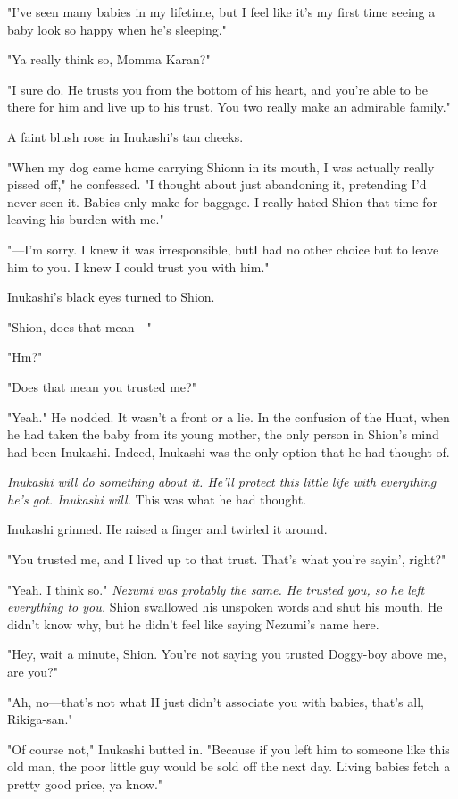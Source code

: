 "I've seen many babies in my lifetime, but I feel like it's my first
time seeing a baby look so happy when he's sleeping."

"Ya really think so, Momma Karan?"

"I sure do. He trusts you from the bottom of his heart, and you're able
to be there for him and live up to his trust. You two really make an
admirable family."

A faint blush rose in Inukashi's tan cheeks.

"When my dog came home carrying Shionn in its mouth, I was actually
really pissed off," he confessed. "I thought about just abandoning it,
pretending I'd never seen it. Babies only make for baggage. I really
hated Shion that time for leaving his burden with me."

"---I'm sorry. I knew it was irresponsible, but\el I had no other choice
but to leave him to you. I knew I could trust you with him."

Inukashi's black eyes turned to Shion.

"Shion, does that mean---"

"Hm?"

"Does that mean you trusted me?"

"Yeah." He nodded. It wasn't a front or a lie. In the confusion of the
Hunt, when he had taken the baby from its young mother, the only person
in Shion's mind had been Inukashi. Indeed, Inukashi was the only option
that he had thought of.

\emph{Inukashi will do something about it. He'll protect this little life with
everything he's got. Inukashi will.} This was what he had thought.

Inukashi grinned. He raised a finger and twirled it around.

"You trusted me, and I lived up to that trust. That's what you're
sayin', right?"

"Yeah. I think so." \emph{Nezumi was probably the same. He trusted you, so he
left everything to you.} Shion swallowed his unspoken words and shut his
mouth. He didn't know why, but he didn't feel like saying Nezumi's name
here.

"Hey, wait a minute, Shion. You're not saying you trusted Doggy-boy
above me, are you?"

"Ah, no---that's not what I\el I just didn't associate you with babies,
that's all, Rikiga-san."

"Of course not," Inukashi butted in. "Because if you left him to someone
like this old man, the poor little guy would be sold off the next day.
Living babies fetch a pretty good price, ya know."

